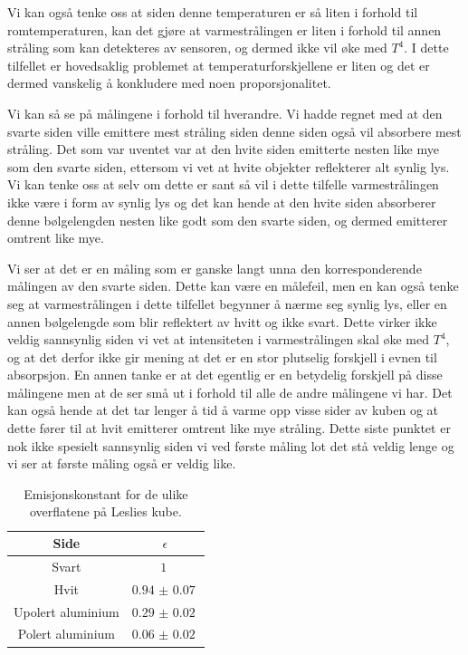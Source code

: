 Vi kan også tenke oss at siden denne temperaturen er så liten i forhold til romtemperaturen, kan det gjøre at varmestrålingen er liten i forhold til annen stråling som kan detekteres av sensoren, og dermed ikke vil øke med $T^{4}$. I dette tilfellet er hovedsaklig problemet at temperaturforskjellene er liten og det er dermed vanskelig å konkludere med noen proporsjonalitet.

Vi kan så se på målingene i forhold til hverandre. Vi hadde regnet med at den svarte siden ville emittere mest stråling siden denne siden også vil absorbere mest stråling. Det som var uventet var at den hvite siden emitterte nesten like mye som den svarte siden, ettersom vi vet at hvite objekter reflekterer alt synlig lys. Vi kan tenke oss at selv om dette er sant så vil i dette tilfelle varmestrålingen ikke være i form av synlig lys og det kan hende at den hvite siden absorberer denne bølgelengden nesten like godt som den svarte siden, og dermed emitterer omtrent like mye.

Vi ser at det er en måling som er ganske langt unna den korresponderende målingen av den svarte siden. Dette kan være en målefeil, men en kan også tenke seg at varmestrålingen i dette tilfellet begynner å nærme seg synlig lys, eller en annen bølgelengde som blir reflektert av hvitt og ikke svart. Dette virker ikke veldig sannsynlig siden vi vet at intensiteten i varmestrålingen skal øke med $T^{4}$, og at det derfor ikke gir mening at det er en stor plutselig forskjell i evnen til absorpsjon. En annen tanke er at det egentlig er en betydelig forskjell på disse målingene men at de ser små ut i forhold til alle de andre målingene vi har. Det kan også hende at det tar lenger å tid å varme opp visse sider av kuben og at dette fører til at hvit emitterer omtrent like mye stråling. Dette siste punktet er nok ikke spesielt sannsynlig siden vi ved første måling lot det stå veldig lenge og vi ser at første måling også er veldig like.

\begin{table}
  \centering
  \caption{Emisjonskonstant for de ulike overflatene på Leslies kube.}
  \begin{tabular}{cc}
    \toprule
    Side & $\epsilon$ \\
    \midrule
    Svart & $\SI{1}{}$ \\
    Hvit & $\SI{0.94(7)}{}$ \\
    Upolert aluminium & $\SI{0.29(2)}{}$ \\
    Polert aluminium & $\SI{0.06(2)}{}$ \\
    \bottomrule
  \end{tabular}
  \label{tab:LeslieEmisjonsevne}
\end{table}


